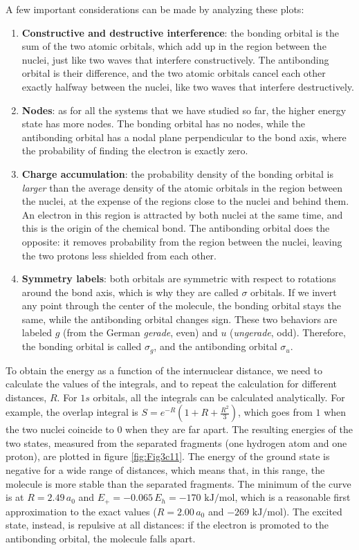 \documentclass[
  english,
  9pt,
]{extbook}
\theoremstyle{definition}
\theoremstyle{definition}
\theoremstyle{definition}
\theoremstyle{definition}
\theoremstyle{remark}
\begin{document}
A few important considerations can be made by analyzing these plots:

\begin{enumerate}
\def\labelenumi{\arabic{enumi}.}
\item
  \textbf{Constructive and destructive interference}: the bonding orbital is the sum of the two atomic orbitals, which add up in the region between the nuclei, just like two waves that interfere constructively. The antibonding orbital is their difference, and the two atomic orbitals cancel each other exactly halfway between the nuclei, like two waves that interfere destructively.
\item
  \textbf{Nodes}: as for all the systems that we have studied so far, the higher energy state has more nodes. The bonding orbital has no nodes, while the antibonding orbital has a nodal plane perpendicular to the bond axis, where the probability of finding the electron is exactly zero.
\item
  \textbf{Charge accumulation}: the probability density of the bonding orbital is \emph{larger} than the average density of the atomic orbitals in the region between the nuclei, at the expense of the regions close to the nuclei and behind them. An electron in this region is attracted by both nuclei at the same time, and this is the origin of the chemical bond. The antibonding orbital does the opposite: it removes probability from the region between the nuclei, leaving the two protons less shielded from each other.
\item
  \textbf{Symmetry labels}: both orbitals are symmetric with respect to rotations around the bond axis, which is why they are called \(\sigma\) orbitals. If we invert any point through the center of the molecule, the bonding orbital stays the same, while the antibonding orbital changes sign. These two behaviors are labeled \(g\) (from the German \emph{gerade}, even) and \(u\) (\emph{ungerade}, odd). Therefore, the bonding orbital is called \(\sigma_g\), and the antibonding orbital \(\sigma_u\).
\end{enumerate}

To obtain the energy as a function of the internuclear distance, we need to calculate the values of the integrals, and to repeat the calculation for different distances, \(R\). For \(1s\) orbitals, all the integrals can be calculated analytically. For example, the overlap integral is \(S=e^{-R}\left(1+R+\frac{R^2}{3}\right)\), which goes from \(1\) when the two nuclei coincide to \(0\) when they are far apart. The resulting energies of the two states, measured from the separated fragments (one hydrogen atom and one proton), are plotted in figure \ref{fig:Fig3c11}. The energy of the ground state is negative for a wide range of distances, which means that, in this range, the molecule is more stable than the separated fragments. The minimum of the curve is at \(R=2.49\,a_0\) and \(E_+=-0.065\,E_h=-170\text{ kJ/mol}\), which is a reasonable first approximation to the exact values (\(R=2.00\,a_0\) and \(-269\text{ kJ/mol}\)). The excited state, instead, is repulsive at all distances: if the electron is promoted to the antibonding orbital, the molecule falls apart.
\end{document}
